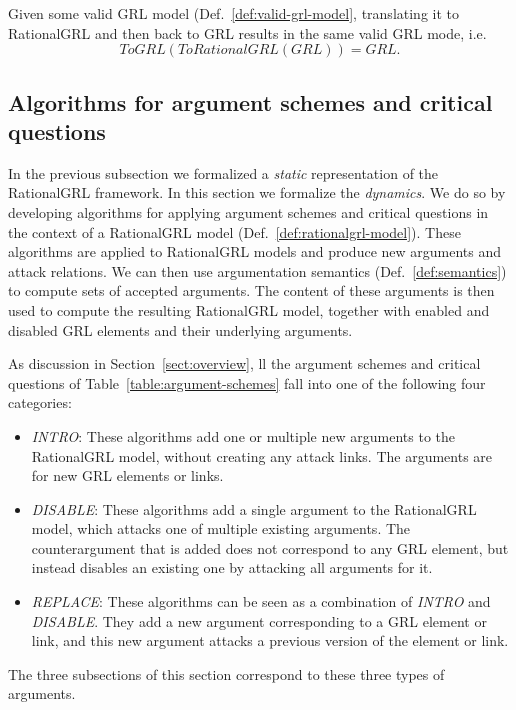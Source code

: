 \begin{theorem}
\label{th:translation-correctness}
Given some valid GRL model (Def.~\ref{def:valid-grl-model}, translating it to RationalGRL and then back to GRL results in the same valid GRL mode, i.e.
$$ToGRL(ToRationalGRL(GRL)) = GRL.$$
\end{theorem}

\subsection{Algorithms for argument schemes and critical questions}
\label{sect:algorithms}

In the previous subsection we formalized a \emph{static} representation of the RationalGRL framework. In this section we formalize the \emph{dynamics}. We do so by developing algorithms for applying argument schemes and critical questions in the context of a RationalGRL model (Def.~\ref{def:rationalgrl-model}). These algorithms are applied to RationalGRL models and produce new arguments and attack relations. We can then use argumentation semantics (Def.~\ref{def:semantics}) to compute sets of accepted arguments. The content of these arguments is then used to compute the resulting RationalGRL model, together with enabled and disabled GRL elements and their underlying arguments.

As discussion in Section~\ref{sect:overview}, ll the argument schemes and critical questions of Table~\ref{table:argument-schemes} fall into one of the following four categories:
\begin{itemize}
\item \emph{INTRO}: These algorithms add one or multiple new arguments to the RationalGRL model, without creating any attack links. The arguments are for new GRL elements or links.
\item \emph{DISABLE}: These algorithms add a single argument to the RationalGRL model, which attacks one of multiple existing arguments. The counterargument that is added does not correspond to any GRL element, but instead disables an existing one by attacking all arguments for it.
\item \emph{REPLACE}: These algorithms can be seen as a combination of \emph{INTRO} and \emph{DISABLE}. They add a new argument corresponding to a GRL element or link, and this new argument attacks a previous version of the element or link. 
\end{itemize}

The three subsections of this section correspond to these three types of arguments.

